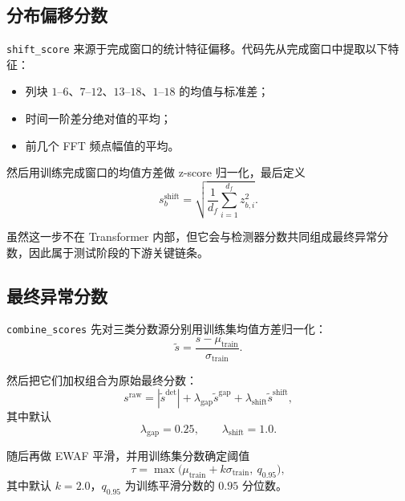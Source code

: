 \documentclass[UTF8]{ctexart}
\begin{document}
\subsection{分布偏移分数}

\texttt{shift\_score} 来源于完成窗口的统计特征偏移。代码先从完成窗口中提取以下特征：
\begin{itemize}
    \item 列块 \(1\text{--}6\)、\(7\text{--}12\)、\(13\text{--}18\)、\(1\text{--}18\) 的均值与标准差；
    \item 时间一阶差分绝对值的平均；
    \item 前几个 FFT 频点幅值的平均。
\end{itemize}

然后用训练完成窗口的均值方差做 z-score 归一化，最后定义
\begin{equation}
    s^{\text{shift}}_b
    =
    \sqrt{
        \frac{1}{d_f}
        \sum_{i=1}^{d_f}
        z_{b,i}^2
    }.
\end{equation}

虽然这一步不在 Transformer 内部，但它会与检测器分数共同组成最终异常分数，因此属于测试阶段的下游关键链条。

\subsection{最终异常分数}

\texttt{combine\_scores} 先对三类分数源分别用训练集均值方差归一化：
\begin{equation}
    \widetilde{s}
    =
    \frac{s - \mu_{\text{train}}}{\sigma_{\text{train}}}.
\end{equation}

然后把它们加权组合为原始最终分数：
\begin{equation}
    s^{\text{raw}}
    =
    \left|\widetilde{s}^{\text{det}}\right|
    +
    \lambda_{\text{gap}}\widetilde{s}^{\text{gap}}
    +
    \lambda_{\text{shift}}\widetilde{s}^{\text{shift}},
\end{equation}
其中默认
\begin{equation}
    \lambda_{\text{gap}} = 0.25,
    \qquad
    \lambda_{\text{shift}} = 1.0.
\end{equation}

随后再做 EWAF 平滑，并用训练集分数确定阈值
\begin{equation}
    \tau = \max\Big(\mu_{\text{train}} + k\sigma_{\text{train}},\ q_{0.95}\Big),
\end{equation}
其中默认 \(k=2.0\)，\(q_{0.95}\) 为训练平滑分数的 \(0.95\) 分位数。
\end{document}
